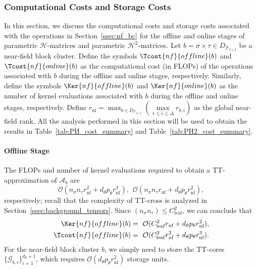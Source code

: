 \documentclass[final,3p,times]{elsarticle}
\newcommand{\mc}[1]{\mathcal{#1}}
\newcommand{\ten}[1]{\boldsymbol{\mathcal{#1}}}
\begin{document}
\subsubsection{Computational Costs and Storage Costs}
In this section, we discuss the computational costs and storage costs associated with the operations in Section~\ref{ssec:nf_bc} for the offline and online stages of parametric $\mc{H}$-matrices and parametric $\mc{H}^{2}$-matrices.
Let $b = \sigma \times \tau \in D_{\mc{T}_{I \times I}}$ be a near-field block cluster. Define the symbols $\Tcost{nf}{offline}(b)$ and $\Tcost{nf}{online}(b)$ as the computational cost (in FLOPs) of the operations associated with $b$ during the offline and online stages, respectively. Similarly, define the symbols $\Ker{nf}{offline}(b)$ and $\Ker{nf}{online}(b)$ as the number of kernel evaluations associated with $b$ during the offline and online stages, respectively. Define 
$r_{\text{nf}} = \max_{b \in D_{\mc{T}_{I \times I}}} (\underset{1 \le i \le \Delta}{\max}r_{b,i})$ as the global near-field rank. All the analysis performed in this section will be used to obtain the results in Table~\ref{tab:PH_cost_summary} and Table~\ref{tab:PH2_cost_summary}. 


\paragraph{Offline Stage}
The  FLOPs and number of kernel evaluations required to obtain a TT-approximation of $\ten{A}_{b}$ are
$$  \mc{O}(n_{\sigma}n_{\tau} r_{\text{nf}}^2 + d_{\theta}p_{\theta}r_{\text{nf}}^{3}), ~ ~ \mc{O}(n_{\sigma}n_{\tau} r_{\text{nf}} + d_{\theta}p_{\theta}r_{\text{nf}}^{2}),$$
respectively; recall that the complexity of TT-cross is analyzed in Section~\ref{ssec:background_tensors}. Since $(n_{\sigma}n_{\tau}) \le C_{\text{leaf}}^{2}$, we can conclude that
\begin{align}
    \Ker{nf}{offline}(b) &=  ~   \mc{O}( C_{\text{leaf}}^2 r_{\text{nf}} + d_{\theta}p_{\theta}r_{\text{nf}}^{2}), \label{keqn:nf_offline} \\ 
        \Tcost{nf}{offline}(b) &= ~  \mc{O}(C_{\text{leaf}}^{2}r_{\text{nf}}^2 +   d_{\theta}p_{\theta}r_{\text{nf}}^{3}). \label{ceqn:nf_offline}
\end{align}
For the near-field block cluster $b$, we simply need to store the TT-cores $\{\ten{G}_{b, i} \}_{i=1}^{d_{\theta} + 1}$, which  requires $\mc{O}(d_{\theta}p_{\theta}r_{\text{nf}}^2)$ storage units.
\end{document}
